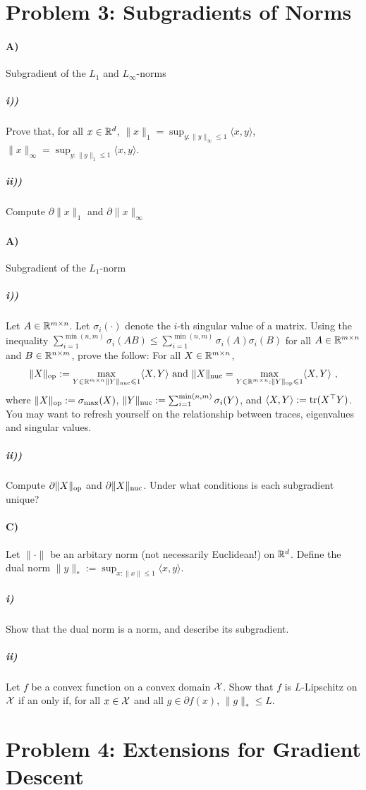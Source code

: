 \documentclass[12pt]{article}
\begin{document}
\section*{Problem 3: Subgradients of Norms}
\paragraph{A)} Subgradient of the $L_1$ and $L_{\infty}$-norms
\subparagraph{i))} Prove that, for all $x \in \mathbb{R}^d$, $\|x\|_1 = \sup_{y: \|y\|_{\infty} \le 1}\langle x, y \rangle$, $\|x\|_{\infty} = \sup_{y:\|y\|_1 \le 1}\langle x, y \rangle$. 
\subparagraph{ii))} Compute $\partial \|x\|_1$ and $\partial \|x\|_{\infty}$
\paragraph{A)} Subgradient of the $L_1$-norm
\subparagraph{i))} Let $A \in \mathbb{R}^{m \times n}$. Let $\sigma_i(\cdot)$ denote the $i$-th singular value of a matrix. Using the inequality $\sum_{i=1}^{\min(n,m)}\sigma_i(AB) \le \sum_{i=1}^{\min(n,m)} \sigma_i(A)\sigma_i(B)$ for all $A \in \mathbb{R}^{m \times n}$ and $B \in \mathbb{R}^{n \times m}$, prove the follow: For all $X \in \mathbb{R}^{m \times n}$, 
\begin{eqnarray}
\|X\|_{\mathrm{op}} :=  \max_{Y \in \mathbb{R}^{m \times n}  \|Y\|_{\mathrm{nuc}} \leqslant 1} \langle X, Y \rangle  \text{ and } \|X\|_{\mathrm{nuc}} =  \max_{Y \in \mathbb{R}^{m \times n} :\|Y\|_{\mathrm{op}} \leqslant 1} \langle X, Y \rangle ~,
\end{eqnarray}
where $\|X\|_{\mathrm{op}} := \sigma_{\max}(X)$, $ \|Y\|_{\mathrm{nuc}} := \sum_{i=1}^{\min(n,m)} \sigma_i(Y)$, and $\langle X, Y \rangle := \mathrm{tr}(X^\top Y)$. You may want to refresh yourself on the relationship between traces, eigenvalues and singular values. 
\subparagraph{ii))} Compute $\partial \|X\|_{\mathrm{op}}$ and $\partial \|X\|_{\mathrm{nuc}}$. Under what conditions is each subgradient unique?
\paragraph{C)} Let  $\|\cdot\|$ be an arbitary norm (not necessarily Euclidean!) on $\mathbb{R}^d$. Define the dual norm $\|y\|_* := \sup_{x: \|x\| \le 1}\langle x,y \rangle$. 
\subparagraph{i)} Show that the dual norm is a norm, and describe its subgradient.
\subparagraph{ii)} Let $f$ be a convex function on a convex domain ${\cal X}$. Show that $f$ is $L$-Lipschitz on ${\cal X}$ if an only if, for all $x \in {\cal X}$ and all $g \in \partial f(x)$, $\|g\|_{*} \le L$. 

\section*{Problem 4: Extensions for Gradient Descent}
\end{document}
